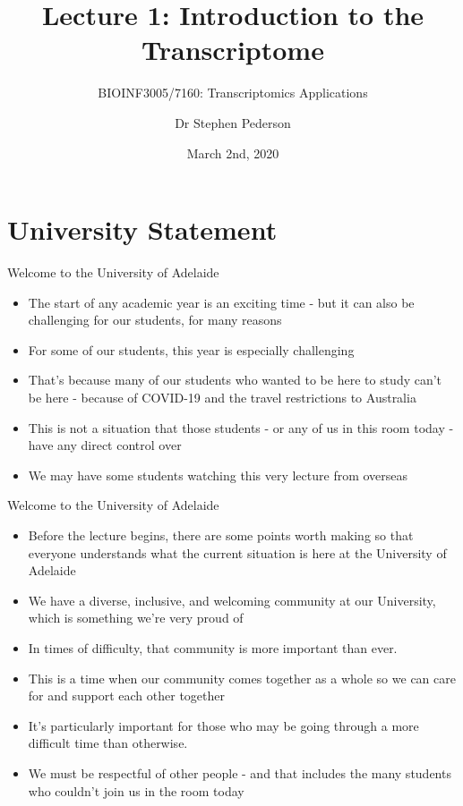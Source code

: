 \documentclass[aspectratio=169,11pt]{beamer}
\author{Dr Stephen Pederson}
\title{Lecture 1: Introduction to the Transcriptome}
\subtitle{BIOINF3005/7160: Transcriptomics Applications}
\institute{Bioinformatics Hub, \\The University of Adelaide}
\date{March 2nd, 2020}
\begin{document}
\begin{frame}
\titlepage
\end{frame}

\begin{frame}
\footnotesize
\tableofcontents
\end{frame}

\section{University Statement}

\begin{frame}{Welcome to the University of Adelaide}

	\begin{itemize}
		\item The start of any academic year is an exciting time - but it can also be challenging for our students, for many reasons
		\item For some of our students, this year is especially challenging
		\item That's because many of our students who wanted to be here to study can't be here - because of COVID-19 and the travel restrictions to Australia
		\item This is not a situation that those students - or any of us in this room today - have any direct control over
		\item We may have some students watching this very lecture from overseas
	\end{itemize}
	
\end{frame}

\begin{frame}{Welcome to the University of Adelaide}

	\begin{itemize}
		\item Before the lecture begins, there are some points worth making so that everyone understands what the current situation is here at the University of Adelaide
		\item We have a diverse, inclusive, and welcoming community at our University, which is something we're very proud of
		\item In times of difficulty, that community is more important than ever.
		\item This is a time when our community comes together as a whole so we can care for and support each other together
		\item It's particularly important for those who may be going through a more difficult time than otherwise. 
		\item We must be respectful of other people - and that includes the many students who couldn't join us in the room today
	\end{itemize}

\end{frame}
\end{document}
